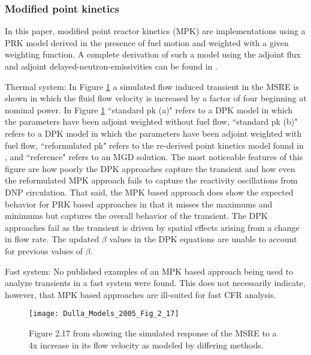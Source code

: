 \documentclass[review]{elsarticle}
\begin{document}
\subsubsection{Modified point kinetics} \label{sssec:mpk}
In this paper,
modified point reactor kinetics (MPK) are implementations
using a PRK model derived in the presence of fuel motion
and weighted with a given weighting function. A complete derivation of such a
model using the adjoint flux and adjoint delayed-neutron-emissivities can be
found in \cite{dulla_models_2005}.
\par Thermal system: In Figure 
\ref{fig:dulla_4x_flow} a simulated flow induced transient in the MSRE
is shown in which the fluid flow velocity is increased by a factor
of four beginning at nominal power.
In Figure \ref{fig:dulla_4x_flow} ``standard pk (a)" refers
to a DPK model in which the parameters have been adjoint weighted without fuel
flow, ``standard pk (b)" refers to a DPK model in which the parameters have
been adjoint weighted with fuel flow, ``reformulated pk" refers to the re-derived
point kinetics model found in \cite{dulla_models_2005}, and ``reference" refers
to an MGD solution. The most noticeable features of this figure are how poorly the
DPK approaches capture the transient and how even the reformulated MPK approach
fails to capture the reactivity oscillations from DNP circulation. That said, the
MPK based approach does show the expected behavior for PRK based approaches in that
it misses the maximums and minimums but captures the overall behavior of the
transient. The DPK approaches fail as the transient is driven by spatial effects
arising from a change in flow rate. The updated $\beta$ values in the DPK equations
are unable to account for previous values of $\beta$.
\par Fast system: No published examples of an MPK based approach being used
to analyze transients in a fast system were found. This does not
necessarily indicate, however, that MPK based approaches are ill-suited for fast
CFR analysis.

\begin{figure}[H]
   \centering
   \texttt{[image: Dulla\_Models\_2005\_Fig\_2\_17]}
   \caption{Figure 2.17 from \cite{dulla_models_2005} showing the simulated response of the MSRE
   to a 4x increase in its flow velocity as modeled by differing methods.} 
   \label{fig:dulla_4x_flow}
\end{figure}
\end{document}
